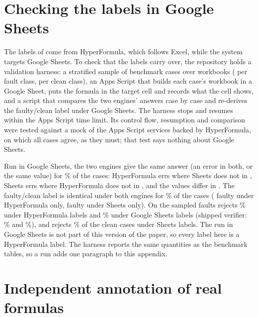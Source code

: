 

\section{Checking the labels in Google Sheets}
\label{app:gsheets}

The labels of \sheetfault{} come from HyperFormula, which follows Excel, while the system targets Google Sheets. To check that the labels carry over, the repository holds a validation harness: a stratified sample of \gsPackCases{} benchmark cases over \gsPackWorkbooks{} workbooks (\gsPackPerFault{} per fault class, \gsPackPerClean{} per clean class), an Apps Script that builds each case's workbook in a Google Sheet, puts the formula in the target cell and records what the cell shows, and a script that compares the two engines' answers case by case and re-derives the faulty/clean label under Google Sheets. The harness stops and resumes within the Apps Script time limit. Its control flow, resumption and comparison were tested against a mock of the Apps Script services backed by HyperFormula, on which all cases agree, as they must; that test says nothing about Google Sheets.

\ifdefined\gsN
Run in Google Sheets, the two engines give the same answer (an error in both, or the same value) for \gsSame\% of the \gsN{} cases: HyperFormula errs where Sheets does not in \gsHfErrOnly{}, Sheets errs where HyperFormula does not in \gsGsErrOnly{}, and the values differ in \gsDiffValues{}. The faulty/clean label is identical under both engines for \gsLabelSame\% of the cases (\gsFlipFault{} faulty under HyperFormula only, \gsFlipClean{} faulty under Sheets only). On the sampled faults \gc{} rejects \gsvtwoRecallHF\% under HyperFormula labels and \gsvtwoRecallGS\% under Google Sheets labels (shipped verifier: \gsvoneRecallHF\% and \gsvoneRecallGS\%), and rejects \gsvtwoFPRGS\% of the clean cases under Sheets labels.
\else
The run in Google Sheets is not part of this version of the paper, so every label here is a HyperFormula label. The harness reports the same quantities as the benchmark tables, so a run adds one paragraph to this appendix.
\fi

\section{Independent annotation of real formulas}
\label{app:annotation}

